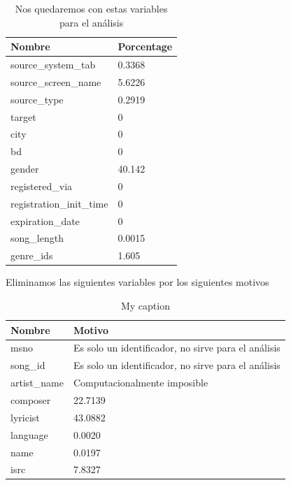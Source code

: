 \documentclass[a4paper]{article}
\begin{document}
\begin{table}[H]
\centering
\caption{Nos quedaremos con estas variables para el análisis}
\label{my-label}
\begin{tabular}{|l|l|}
\hline
Nombre                   & Porcentage \\ \hline
source\_system\_tab      & 0.3368     \\ \hline
source\_screen\_name     & 5.6226     \\ \hline
source\_type             & 0.2919     \\ \hline
target                   & 0          \\ \hline
city                     & 0          \\ \hline
bd                       & 0          \\ \hline
gender                   & 40.142     \\ \hline
registered\_via          & 0          \\ \hline
registration\_init\_time & 0          \\ \hline
expiration\_date         & 0          \\ \hline
song\_length             & 0.0015     \\ \hline
genre\_ids               & 1.605      \\ \hline
\end{tabular}
\end{table}

Eliminamos las siguientes variables por los siguientes motivos


\begin{table}[H]
\centering
\caption{My caption}
\label{my-label}
\begin{tabular}{|l|l|}
\hline
Nombre                   & Motivo \\ \hline
msno                     & Es solo un identificador, no sirve para el análisis \\ \hline
song\_id                 & Es solo un identificador, no sirve para el análisis \\ \hline
artist\_name             & Computacionalmente imposible \\ \hline
composer                 & 22.7139    \\ \hline
lyricist                 & 43.0882    \\ \hline
language                 & 0.0020     \\ \hline
name                     & 0.0197     \\ \hline
isrc                     & 7.8327     \\ \hline
\end{tabular}
\end{table}
\end{document}
